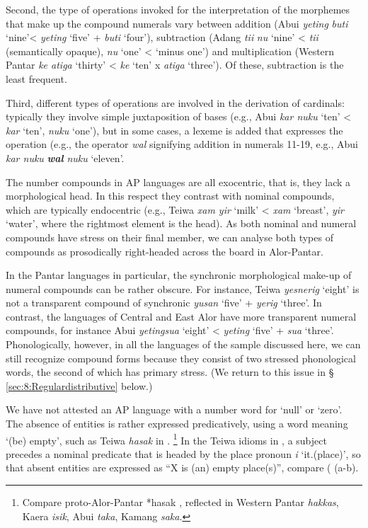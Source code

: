 Second, the type of operations invoked for the interpretation of the morphemes that make up the compound numerals vary between addition (Abui \textit{yeting} \textit{buti} `nine'{\textless} \textit{yeting} `five' + \textit{buti} `four'), subtraction (Adang  \textit{ti}\textit{{\textglotstop}}\textit{i} \textit{nu} `nine' {\textless} \textit{ti}\textit{{\textglotstop}}\textit{i} (semantically opaque), \textit{nu} `one' {\textless} `minus one') and multiplication (Western Pantar \textit{ke atiga} `thirty' {\textless} \textit{ke} `ten' x \textit{atiga} `three'). Of these, subtraction is the least frequent.

Third, different types of operations are involved in the derivation of cardinals: typically they involve simple juxtaposition of bases (e.g., Abui \textit{kar nuku} `ten' {\textless} \textit{kar} `ten', \textit{nuku} `one'), but in some cases, a lexeme is added that expresses the operation (e.g., the operator \textit{wal} signifying addition in numerals 11-19, e.g., Abui \textit{kar nuku} \textbf{\textit{wal}} \textit{nuku} `eleven'. 

The number compounds in AP languages are all exocentric, that is, they lack a morphological head. In this respect they contrast with nominal compounds, which are typically endocentric (e.g., Teiwa \textit{xam yir} `milk' {\textless} \textit{xam} `breast', \textit{yir} `water', where the rightmost element is the head). As both nominal and numeral compounds have stress on their final member, we can analyse both types of compounds as prosodically right-headed across the board in Alor-Pantar. 

In the Pantar languages in particular, the synchronic morphological make-up of numeral compounds can be rather obscure. For instance, Teiwa \textit{yesnerig} `eight' is not a transparent compound of synchronic \textit{yusan} `five' + \textit{yerig} `three'. In contrast, the languages of Central and East Alor have more transparent numeral compounds, for instance Abui \textit{yetingsua} `eight' {\textless} \textit{yeting} `five' + \textit{sua} `three'. Phonologically, however, in all the languages of the sample discussed here, we can still recognize compound forms because they consist of two stressed phonological words, the second of which has primary stress. (We return to this issue in {\S} \ref{sec:8:Regulardistributive} below.) 

We have not attested an AP language with a number word for `null' or `zero'. The absence of entities is rather expressed predicatively, using a word meaning `(be) empty', such as Teiwa \textit{hasak} in .
\footnote{Compare proto-Alor-Pantar *hasak \citep{HoltonRobinsonTVhistory}, reflected in Western Pantar \textit{hakkas}, Kaera \textit{isik}, Abui \textit{taka}, Kamang \textit{saka}.} In the Teiwa idioms in , a subject precedes a nominal predicate that is headed by the place pronoun \textit{i} `it.(place)', so that absent entities are expressed as ``X is (an) empty place(s)'', compare ( (a-b).


